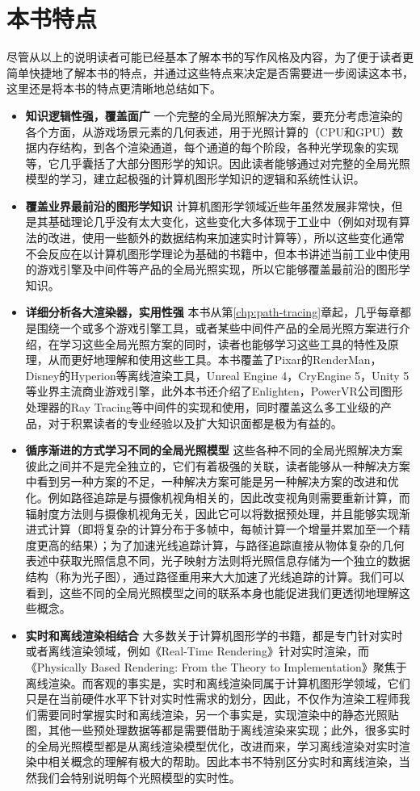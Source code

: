 \section*{本书特点}
尽管从以上的说明读者可能已经基本了解本书的写作风格及内容，为了便于读者更简单快捷地了解本书的特点，并通过这些特点来决定是否需要进一步阅读这本书，这里还是将本书的特点更清晰地总结如下。

\begin{itemize}
	\item \textbf{知识逻辑性强，覆盖面广 } 一个完整的全局光照解决方案，要充分考虑渲染的各个方面，从游戏场景元素的几何表述，用于光照计算的（CPU和GPU）数据内存结构，到各个渲染通道，每个通道的每个阶段，各种光学现象的实现等，它几乎囊括了大部分图形学的知识。因此读者能够通过对完整的全局光照模型的学习，建立起极强的计算机图形学知识的逻辑和系统性认识。
	\item \textbf{覆盖业界最前沿的图形学知识 } 计算机图形学领域近些年虽然发展非常快，但是其基础理论几乎没有太大变化，这些变化大多体现于工业中（例如对现有算法的改进，使用一些额外的数据结构来加速实时计算等），所以这些变化通常不会反应在以计算机图形学理论为基础的书籍中，但本书讲述当前工业中使用的游戏引擎及中间件等产品的全局光照实现，所以它能够覆盖最前沿的图形学知识。
	\item \textbf{详细分析各大渲染器，实用性强 } 本书从第\ref{chp:path-tracing}章起，几乎每章都是围绕一个或多个游戏引擎工具，或者某些中间件产品的全局光照方案进行介绍，在学习这些全局光照方案的同时，读者也能够学习这些工具的特性及原理，从而更好地理解和使用这些工具。本书覆盖了Pixar的RenderMan，Disney的Hyperion等离线渲染工具，Unreal Engine 4，CryEngine 5，Unity 5等业界主流商业游戏引擎，此外本书还介绍了Enlighten，PowerVR公司图形处理器的Ray Tracing等中间件的实现和使用，同时覆盖这么多工业级的产品，对于积累读者的专业经验以及扩大知识面都是极为有益的。
	\item \textbf{循序渐进的方式学习不同的全局光照模型 } 这些各种不同的全局光照解决方案彼此之间并不是完全独立的，它们有着极强的关联，读者能够从一种解决方案中看到另一种方案的不足，一种解决方案可能是另一种解决方案的改进和优化。例如路径追踪是与摄像机视角相关的，因此改变视角则需要重新计算，而辐射度方法则与摄像机视角无关，因此它可以将数据预处理，并且能够实现渐进式计算（即将复杂的计算分布于多帧中，每帧计算一个增量并累加至一个精度更高的结果）；为了加速光线追踪计算，与路径追踪直接从物体复杂的几何表述中获取光照信息不同，光子映射方法则将光照信息存储为一个独立的数据结构（称为光子图），通过路径重用来大大加速了光线追踪的计算。我们可以看到，这些不同的全局光照模型之间的联系本身也能促进我们更透彻地理解这些概念。
	\item \textbf{实时和离线渲染相结合 } 大多数关于计算机图形学的书籍，都是专门针对实时或者离线渲染领域，例如《Real-Time Rendering》针对实时渲染，而《Physically Based Rendering: From the Theory to Implementation》聚焦于离线渲染。而客观的事实是，实时和离线渲染同属于计算机图形学领域，它们只是在当前硬件水平下针对实时性需求的划分，因此，不仅作为渲染工程师我们需要同时掌握实时和离线渲染，另一个事实是，实现渲染中的静态光照贴图，其他一些预处理数据等都是需要借助于离线渲染来实现；此外，很多实时的全局光照模型都是从离线渲染模型优化，改进而来，学习离线渲染对实时渲染中相关概念的理解有极大的帮助。因此本书不特别区分实时和离线渲染，当然我们会特别说明每个光照模型的实时性。

\end{itemize}
